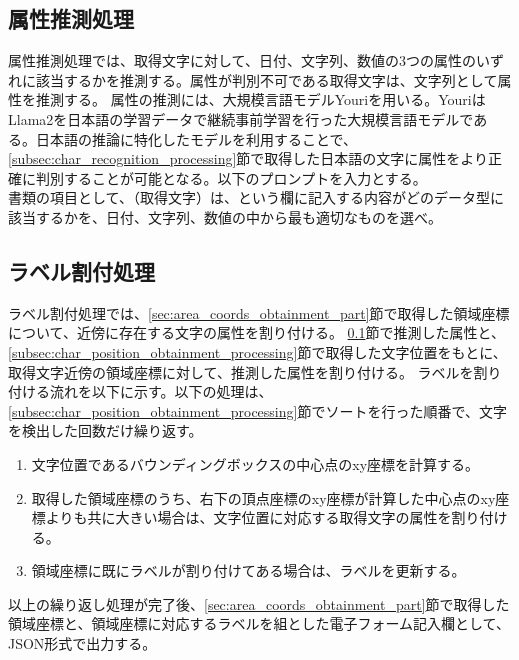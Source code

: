 \subsection{属性推測処理}\label{subsec:att_prediction_processing}
属性推測処理では、取得文字に対して、日付、文字列、数値の3つの属性のいずれに該当するかを推測する。属性が判別不可である取得文字は、文字列として属性を推測する。
属性の推測には、大規模言語モデルYouriを用いる。YouriはLlama2を日本語の学習データで継続事前学習を行った大規模言語モデルである。日本語の推論に特化したモデルを利用することで、\ref{subsec:char_recognition_processing}節で取得した日本語の文字に属性をより正確に判別することが可能となる。以下のプロンプトを入力とする。\\

書類の項目として、（取得文字）は、という欄に記入する内容がどのデータ型に該当するかを、日付、文字列、数値の中から最も適切なものを選べ。

\subsection{ラベル割付処理}\label{subsec:label_link_processing}
ラベル割付処理では、\ref{sec:area_coords_obtainment_part}節で取得した領域座標について、近傍に存在する文字の属性を割り付ける。
\ref{subsec:att_prediction_processing}節で推測した属性と、\ref{subsec:char_position_obtainment_processing}節で取得した文字位置をもとに、取得文字近傍の領域座標に対して、推測した属性を割り付ける。
ラベルを割り付ける流れを以下に示す。以下の処理は、\ref{subsec:char_position_obtainment_processing}節でソートを行った順番で、文字を検出した回数だけ繰り返す。

\begin{enumerate}
    \item 文字位置であるバウンディングボックスの中心点のxy座標を計算する。
    \item 取得した領域座標のうち、右下の頂点座標のxy座標が計算した中心点のxy座標よりも共に大きい場合は、文字位置に対応する取得文字の属性を割り付ける。
    \item 領域座標に既にラベルが割り付けてある場合は、ラベルを更新する。
\end{enumerate}

以上の繰り返し処理が完了後、\ref{sec:area_coords_obtainment_part}節で取得した領域座標と、領域座標に対応するラベルを組とした電子フォーム記入欄として、JSON形式で出力する。
